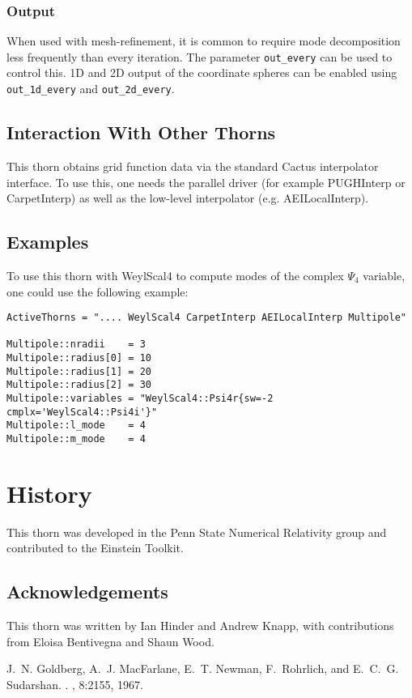 \documentclass{article}
\begin{document}
\subsubsection{Output}
When used with mesh-refinement, it is common to require mode
decomposition less frequently than every iteration.  The parameter
\verb|out_every| can be used to control this.  1D and 2D output of the
coordinate spheres can be enabled using \verb|out_1d_every| and
\verb|out_2d_every|.

\subsection{Interaction With Other Thorns}

This thorn obtains grid function data via the standard Cactus
interpolator interface.  To use this, one needs the parallel driver
(for example PUGHInterp or CarpetInterp) as well as the low-level
interpolator (e.g. AEILocalInterp).

\subsection{Examples}

To use this thorn with WeylScal4 to compute modes of the complex
$\Psi_4$ variable, one could use the following example:

\begin{verbatim}
ActiveThorns = ".... WeylScal4 CarpetInterp AEILocalInterp Multipole"

Multipole::nradii    = 3
Multipole::radius[0] = 10
Multipole::radius[1] = 20
Multipole::radius[2] = 30
Multipole::variables = "WeylScal4::Psi4r{sw=-2 cmplx='WeylScal4::Psi4i'}"
Multipole::l_mode    = 4
Multipole::m_mode    = 4
\end{verbatim}

\section{History}

This thorn was developed in the Penn State Numerical Relativity group
and contributed to the Einstein Toolkit.

\subsection{Acknowledgements}

This thorn was written by Ian Hinder and Andrew Knapp, with
contributions from Eloisa Bentivegna and Shaun Wood.

%
%

\begin{thebibliography}{1}
J.~N. Goldberg, A.~J. MacFarlane, E.~T. Newman, F.~Rohrlich, and E.~C.~G.
  Sudarshan.
.
, 8:2155, 1967.
\end{thebibliography}

\end{document}
